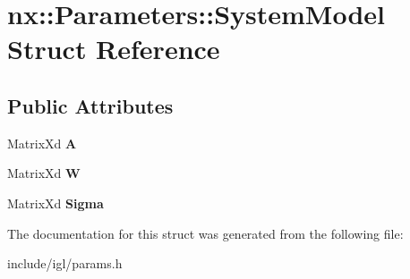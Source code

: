 \hypertarget{structnx_1_1Parameters_1_1SystemModel}{}\section{nx\+:\+:Parameters\+:\+:System\+Model Struct Reference}
\label{structnx_1_1Parameters_1_1SystemModel}
\subsection*{Public Attributes}
\begin{DoxyCompactItemize}
\item 
\mbox{\label{structnx_1_1Parameters_1_1SystemModel_adc7fd68f307417b887de7e7fca6fba87}} 
Matrix\+Xd {\bfseries A}
\item 
\mbox{\label{structnx_1_1Parameters_1_1SystemModel_a2b2721875cd6e914404ac4f4a1746de8}} 
Matrix\+Xd {\bfseries W}
\item 
\mbox{\label{structnx_1_1Parameters_1_1SystemModel_acbb64adfb3494c8489eeafd4975e808c}} 
Matrix\+Xd {\bfseries Sigma}
\end{DoxyCompactItemize}


The documentation for this struct was generated from the following file\+:\begin{DoxyCompactItemize}
\item 
include/igl/params.\+h\end{DoxyCompactItemize}
